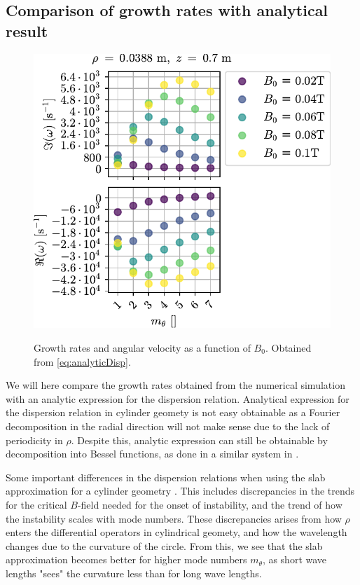 \subsection{Comparison of growth rates with analytical result}
%
\begin{figure}
    \centering
    \includegraphics{fig/results/growthRates/growthRatesAnalyticB0}
    \label{fig:grAnalytic}
    \caption{Growth rates and angular velocity as a function of $B_0$.
        Obtained from \cref{eq:analyticDisp}.}
\end{figure}
%
We will here compare the growth rates obtained from the numerical simulation with an analytic expression for the dispersion relation.
Analytical expression for the dispersion relation in cylinder geomety is not easy obtainable as a Fourier decomposition in the radial direction will not make sense due to the lack of periodicity in $\rho$. Despite this, analytic expression can still be obtainable by decomposition into Bessel functions, as done in a similar system in \cite{Rasmussen2006a}.

Some important differences in the dispersion relations when using the slab approximation for a cylinder geometry \cite{Ellis1980}.
This includes discrepancies in the trends for the critical $B$-field needed for the onset of instability, and the trend of how the instability scales with mode numbers.
These discrepancies arises from how $\rho$ enters the differential operators in cylindrical geomety, and how the wavelength changes due to the curvature of the circle.
From this, we see that the slab approximation becomes better for higher mode numbers $m_\theta$, as short wave lengths "sees" the curvature less than for long wave lengths.

